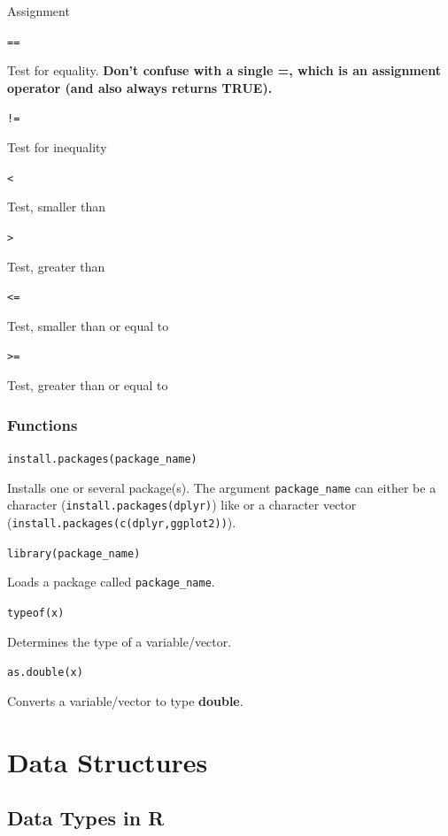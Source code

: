 \documentclass[
]{book}
\begin{document}
Assignment

\texttt{==}

Test for equality. \textbf{Don't confuse with a single =, which is an assignment operator (and also always returns TRUE).}

\texttt{!=}

Test for inequality

\texttt{\textless{}}

Test, smaller than

\texttt{\textgreater{}}

Test, greater than

\texttt{\textless{}=}

Test, smaller than or equal to

\texttt{\textgreater{}=}

Test, greater than or equal to

\subsection{Functions}\label{functions}

\texttt{install.packages(package\_name)}

Installs one or several package(s).
The argument \texttt{package\_name} can either be a character (\texttt{install.packages(\textquotesingle{}dplyr\textquotesingle{})}) like or a character vector (\texttt{install.packages(c(\textquotesingle{}dplyr\textquotesingle{},\textquotesingle{}ggplot2\textquotesingle{}))}).

\texttt{library(package\_name)}

Loads a package called \texttt{package\_name}.

\hfill\break

\texttt{typeof(x)}

Determines the type of a variable/vector.

\hfill\break

\texttt{as.double(x)}

Converts a variable/vector to type \textbf{double}.

\chapter{Data Structures}\label{data-structures}

\section{Data Types in R}\label{data-types-in-r}
\end{document}
